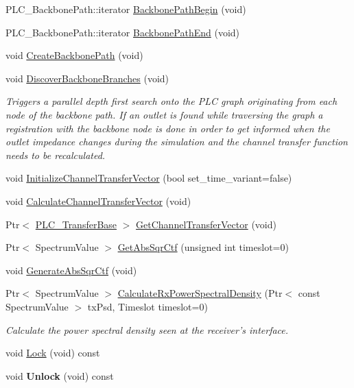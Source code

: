 \begin{DoxyCompactItemize}
\item 
\-P\-L\-C\-\_\-\-Backbone\-Path\-::iterator \hyperlink{classns3_1_1PLC__ChannelTransferImpl_ab3d728667ee846163ba56e925736cca6}{\-Backbone\-Path\-Begin} (void)
\item 
\-P\-L\-C\-\_\-\-Backbone\-Path\-::iterator \hyperlink{classns3_1_1PLC__ChannelTransferImpl_a950a1d1c561995e923ab9e3f95bb58d8}{\-Backbone\-Path\-End} (void)
\item 
void \hyperlink{classns3_1_1PLC__ChannelTransferImpl_a582253c799d69225502e5ac42b982124}{\-Create\-Backbone\-Path} (void)
\item 
void \hyperlink{classns3_1_1PLC__ChannelTransferImpl_a7b46950025353634deb5cd0e239b1da4}{\-Discover\-Backbone\-Branches} (void)
\begin{DoxyCompactList}\small\item\em \-Triggers a parallel depth first search onto the \-P\-L\-C graph originating from each node of the backbone path. \-If an outlet is found while traversing the graph a registration with the backbone node is done in order to get informed when the outlet impedance changes during the simulation and the channel transfer function needs to be recalculated. \end{DoxyCompactList}\item 
void \hyperlink{classns3_1_1PLC__ChannelTransferImpl_ae91aa6f04d300ad7c246e797540aed69}{\-Initialize\-Channel\-Transfer\-Vector} (bool set\-\_\-time\-\_\-variant=false)
\item 
void \hyperlink{classns3_1_1PLC__ChannelTransferImpl_ae2d8f97c7f06512573f6c2ee6df8c89f}{\-Calculate\-Channel\-Transfer\-Vector} (void)
\item 
\-Ptr$<$ \hyperlink{classns3_1_1PLC__ValueBase}{\-P\-L\-C\-\_\-\-Transfer\-Base} $>$ \hyperlink{classns3_1_1PLC__ChannelTransferImpl_adac05b35a3b2080d6ccd78c50a8a83c4}{\-Get\-Channel\-Transfer\-Vector} (void)
\item 
\-Ptr$<$ \-Spectrum\-Value $>$ \hyperlink{classns3_1_1PLC__ChannelTransferImpl_a0e4b0a7b0252655f7d150e01872bfc12}{\-Get\-Abs\-Sqr\-Ctf} (unsigned int timeslot=0)
\item 
void \hyperlink{classns3_1_1PLC__ChannelTransferImpl_ab46c85b0bd89898e3cb62f4fdad438a1}{\-Generate\-Abs\-Sqr\-Ctf} (void)
\item 
\-Ptr$<$ \-Spectrum\-Value $>$ \hyperlink{classns3_1_1PLC__ChannelTransferImpl_ae57dedf11484bf8dae9519b7736c37db}{\-Calculate\-Rx\-Power\-Spectral\-Density} (\-Ptr$<$ const \-Spectrum\-Value $>$ tx\-Psd, \-Timeslot timeslot=0)
\begin{DoxyCompactList}\small\item\em \-Calculate the power spectral density seen at the receiver's interface. \end{DoxyCompactList}\item 
void \hyperlink{classns3_1_1PLC__ChannelTransferImpl_a259a5f13bdbfed36bc21b47407eec734}{\-Lock} (void) const 
\item 
\hypertarget{classns3_1_1PLC__ChannelTransferImpl_a8e448bde1deeaa0d6e1e773d9fbc1df3}{void {\bfseries \-Unlock} (void) const }\label{classns3_1_1PLC__ChannelTransferImpl_a8e448bde1deeaa0d6e1e773d9fbc1df3}

\end{DoxyCompactItemize}
